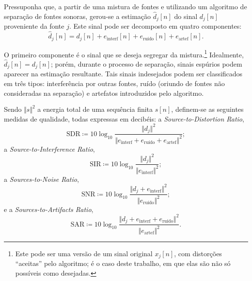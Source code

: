 Pressuponha que, a partir de uma mistura de fontes e utilizando um algoritmo de
separação de fontes sonoras, gerou-se a estimação $\hat{d}_j[n]$ do sinal $d_j[n]$
proveniente da fonte $j$. Este sinal pode ser decomposto em quatro componentes:
\begin{equation}
	\hat{d}_j[n] = d_j[n] + e_{\text{interf}}[n] + e_{\text{ruído}}[n] + e_{\text{artef}}[n].
	\label{eq:metrics:d-hat}
\end{equation}

O primeiro componente é o sinal que se deseja segregar da mistura.\footnote{Este pode
ser uma versão de um sinal original $x_j[n]$, com distorções ``aceitas'' pelo
algoritmo; é o caso deste trabalho, em que elas são não só possíveis como desejadas.}
Idealmente, $\hat{d}_j[n] = d_j[n]$; porém, durante o processo de separação, sinais
espúrios podem aparecer na estimação resultante. Tais sinais indesejados podem ser
classificados em três tipos: interferência por outras fontes, ruído (oriundo de fontes
não consideradas na separação) e artefatos introduzidos pelo algoritmo.

Sendo $\Vert s \Vert^2$ a energia total de
uma sequência finita $s[n]$, definem-se as seguintes medidas de qualidade, todas
expressas em decibéis: a \textit{Source-to-Distortion Ratio},
\begin{equation}
	\text{SDR} \coloneqq 10 \log_{10} \frac{\Vert d_j \Vert^2}{\Vert e_{\text{interf}} + e_{\text{ruído}} + e_{\text{artef}} \Vert^2};
	\label{eq:metrics:sdr-original}
\end{equation}
a \textit{Source-to-Interference Ratio},
\begin{equation}
	\text{SIR} \coloneqq 10 \log_{10} \frac{\Vert d_j \Vert^2}{\Vert e_{\text{interf}} \Vert^2};
\end{equation}
a \textit{Sources-to-Noise Ratio},
\begin{equation}
	\text{SNR} \coloneqq 10 \log_{10} \frac{\Vert d_j + e_{\text{interf}} \Vert^2}{\Vert e_{\text{ruído}}\Vert^2};
\end{equation}
e a \textit{Sources-to-Artifacts Ratio},
\begin{equation}
	\text{SAR} \coloneqq 10 \log_{10} \frac{\Vert d_j + e_{\text{interf}} + e_{\text{ruído}}\Vert^2}{\Vert e_{\text{artef}} \Vert^2}.
\end{equation}

